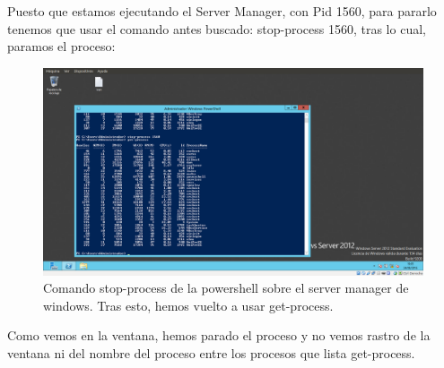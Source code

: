 \begin{itemize}
	Puesto que estamos ejecutando el Server Manager, con Pid 1560, para pararlo tenemos que usar el comando antes buscado: stop-process 1560, tras lo cual, paramos el proceso:\\
	
	\begin{figure}[H]
		\centering
		\includegraphics[width=0.7\linewidth]{Powershellstopprocess}
		\caption[Powershell stop process]{Comando stop-process de la powershell sobre el server manager de windows. Tras esto, hemos vuelto a usar get-process.}
		\label{fig:Powershellstopprocess}
	\end{figure}
	
	Como vemos en la ventana, hemos parado el proceso y no vemos rastro de la ventana ni del nombre del proceso entre los procesos que lista get-process.


\end{itemize}





